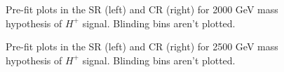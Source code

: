 \begin{figure}[H]
  \centering
  \caption{Pre-fit plots in the SR (left) and CR (right) for 2000 GeV mass hypothesis of $H^{+}$ signal. Blinding bins aren't plotted.}
  \label{fig:Prefit_Hp2000_Blind}
\end{figure}
\begin{figure}[H]
  \centering
  \caption{Pre-fit plots in the SR (left) and CR (right) for 2500 GeV mass hypothesis of $H^{+}$ signal. Blinding bins aren't plotted.}
  \label{fig:Prefit_Hp2500_Blind}
\end{figure}
